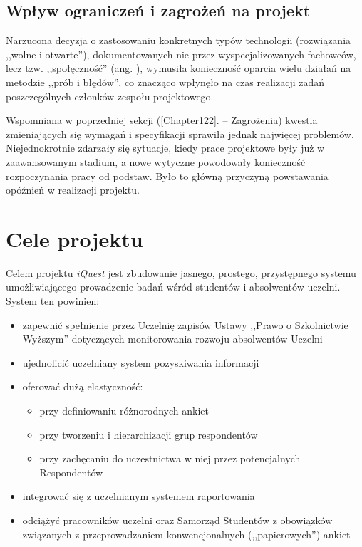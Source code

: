 \subsection{Wpływ ograniczeń i zagrożeń na projekt}
\label{Chapter123}

Narzucona decyzja o zastosowaniu konkretnych typów technologii (rozwiązania ,,wolne i otwarte''), dokumentowanych nie przez wyspecjalizowanych fachowców, lecz tzw. ,,społęczność'' (ang. ), wymusiła konieczność oparcia wielu działań na metodzie ,,prób i błędów'', co znacząco wpłynęło na czas realizacji zadań poszczególnych członków zespołu projektowego.

Wspomniana w poprzedniej sekcji (\ref{Chapter122}. -- Zagrożenia) kwestia zmieniających się wymagań i specyfikacji sprawiła jednak najwięcej problemów. Niejednokrotnie zdarzały się sytuacje, kiedy prace projektowe były już w zaawansowanym stadium, a nowe wytyczne powodowały konieczność rozpoczynania pracy od podstaw. Było to główną przyczyną powstawania opóźnień w realizacji projektu.

\section{Cele projektu}
\label{Chapter13}

Celem projektu \textit{iQuest} jest zbudowanie jasnego, prostego, przystępnego systemu umożliwiającego prowadzenie badań wśród studentów i absolwentów uczelni. System ten powinien:
\begin{itemize}
\item{zapewnić spełnienie przez Uczelnię zapisów Ustawy ,,Prawo o Szkolnictwie Wyższym'' dotyczących monitorowania rozwoju absolwentów Uczelni\cite{AP:PoSW05}}
\item{ujednolicić uczelniany system pozyskiwania informacji}
\item{oferować dużą elastyczność:
\begin{itemize}
\item{przy definiowaniu różnorodnych ankiet}
\item{przy tworzeniu i hierarchizacji grup respondentów}
\item{przy zachęcaniu do uczestnictwa w niej przez potencjalnych Respondentów}
\end{itemize}}
\item{integrować się z uczelnianym systemem raportowania}
\item{odciążyć pracowników uczelni oraz Samorząd Studentów z obowiązków związanych z przeprowadzaniem konwencjonalnych (,,papierowych'') ankiet}
\end{itemize}

